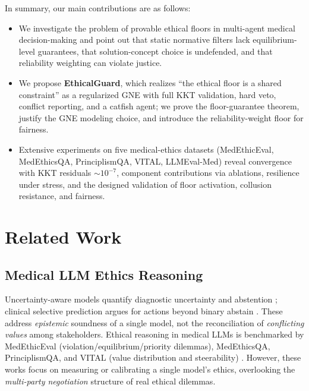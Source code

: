 \documentclass[11pt]{article}
\begin{document}
In summary, our main contributions are as follows:
\begin{itemize}
  \item We investigate the problem of provable ethical floors in multi-agent
  medical decision-making and point out that static normative filters lack
  equilibrium-level guarantees, that solution-concept choice is undefended,
  and that reliability weighting can violate justice.
  \item We propose \textbf{EthicalGuard}, which realizes ``the ethical floor
  is a shared constraint'' as a regularized GNE with full KKT validation,
  hard veto, conflict reporting, and a catfish agent; we prove the
  floor-guarantee theorem, justify the GNE modeling choice, and introduce the
  reliability-weight floor for fairness.
  \item Extensive experiments on five medical-ethics datasets
  (MedEthicEval, MedEthicsQA, PrinciplismQA, VITAL, LLMEval-Med) reveal
  convergence with KKT residuals $\sim10^{-7}$, component contributions via
  ablations, resilience under stress, and the designed validation of
  floor activation, collusion resistance, and fairness.
\end{itemize}

\section{Related Work}
\subsection{Medical LLM Ethics Reasoning}
Uncertainty-aware models quantify diagnostic uncertainty and abstention
\cite{confidx,entropy2026}; clinical selective prediction argues for actions
beyond binary abstain \cite{limits2025}. These address \emph{epistemic}
soundness of a single model, not the reconciliation of \emph{conflicting
values} among stakeholders. Ethical reasoning in medical LLMs is benchmarked
by MedEthicEval (violation/equilibrium/priority dilemmas), MedEthicsQA,
PrinciplismQA, and VITAL (value distribution and steerability)
\cite{medethiceval,medethicsqa,principlismqa,vital}. However, these works
focus on measuring or calibrating a single model's ethics, overlooking the
\emph{multi-party negotiation} structure of real ethical dilemmas.
\end{document}
